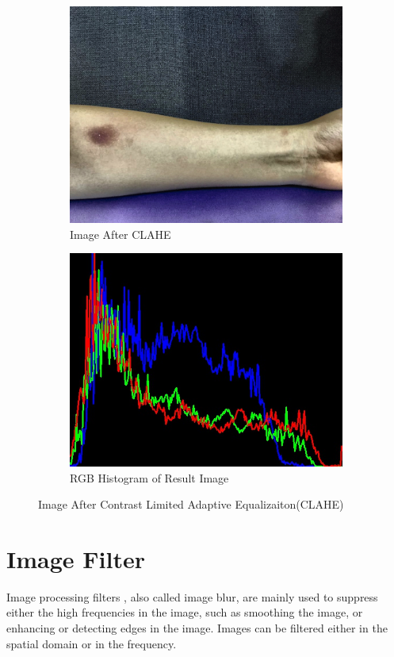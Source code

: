 \begin{figure}[!h]
\begin{subfigure}{.5\textwidth}
  \includegraphics[scale=0.23]{img/cla2}
  \caption{Image After CLAHE}
  \label{fig:sub2}
\end{subfigure}%
\begin{subfigure}{.5\textwidth}
  \centering
  \includegraphics[scale=0.43]{img/imagecla}
  \caption{RGB Histogram of Result Image}
  \label{fig:sub1}
\end{subfigure}
\label{fig:test}
\caption{Image After Contrast Limited Adaptive Equalizaiton(CLAHE)}
\end{figure}

\newpage
\section{Image Filter}
Image processing filters \cite{Jain}, also called image blur, are mainly used to suppress either the high frequencies in the image, such as smoothing the image, or enhancing or detecting edges in the image. Images can be filtered either in the spatial domain or  in the frequency.

